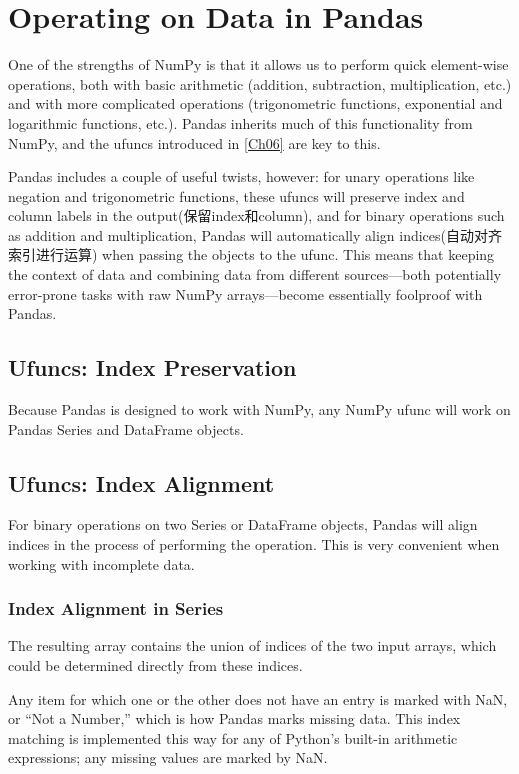\chapter{Operating on Data in Pandas\label{Ch15}}
One of the strengths of NumPy is that it allows us to perform quick element-wise
operations, both with basic arithmetic (addition, subtraction, multiplication, etc.) and
with more complicated operations (trigonometric functions, exponential and logarithmic functions, etc.). Pandas inherits much of this functionality from NumPy, and
the ufuncs introduced in \autoref{Ch06} are key to this.

Pandas includes a couple of useful twists, however: for unary operations like negation
and trigonometric functions, these ufuncs will preserve index and column labels in the
output(保留index和column), and for binary operations such as addition and multiplication, Pandas will
automatically align indices(自动对齐索引进行运算) when passing the objects to the ufunc. This means that
keeping the context of data and combining data from different sources—both potentially error-prone tasks with raw NumPy arrays—become essentially foolproof with
Pandas.

\section{Ufuncs: Index Preservation}
Because Pandas is designed to work with NumPy, any NumPy ufunc will work on
Pandas Series and DataFrame objects.

\section{Ufuncs: Index Alignment}
For binary operations on two Series or DataFrame objects, Pandas will align indices
in the process of performing the operation. This is very convenient when working
with incomplete data.

\subsection*{Index Alignment in Series}

The resulting array contains the union of indices of the two input arrays, which could
be determined directly from these indices.

Any item for which one or the other does not have an entry is marked with NaN, or
“Not a Number,” which is how Pandas marks missing data. This index matching is implemented this way for any of
Python’s built-in arithmetic expressions; any missing values are marked by NaN.

